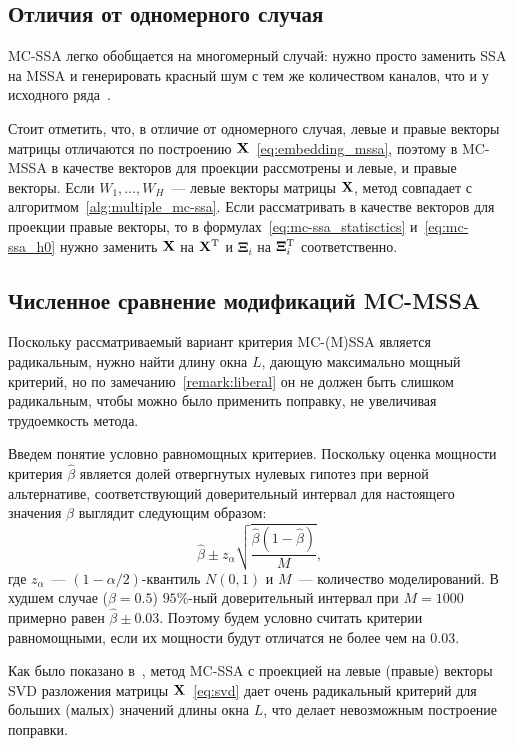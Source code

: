 \documentclass[specialist,
substylefile = spbu.rtx,
               subf,href,colorlinks=true,12pt]{disser}
\theoremstyle{definition}
\begin{document}
\subsection{Отличия от одномерного случая}
MC-SSA легко обобщается на многомерный случай: нужно просто заменить SSA на MSSA и генерировать красный шум с тем же количеством каналов, что и у исходного ряда~\cite{Groth2015}.

Стоит отметить, что, в отличие от одномерного случая, левые и правые векторы матрицы отличаются по построению $\mathbf{X}$~\eqref{eq:embedding_mssa}, поэтому в MC-MSSA в качестве векторов для проекции рассмотрены и левые, и правые векторы. Если $W_1,\ldots,W_H$~--- левые векторы матрицы $\mathbf{X}$, метод совпадает с алгоритмом~\ref{alg:multiple_mc-ssa}. Если рассматривать в качестве векторов для проекции правые векторы, то в формулах~\eqref{eq:mc-ssa_statisctics} и~\eqref{eq:mc-ssa_h0} нужно заменить $\mathbf{X}$ на $\mathbf{X}^{\mathrm{T}}$ и $\mathbf{\Xi}_i$ на $\mathbf{\Xi}_i^{\mathrm{T}}$ соответственно.

\subsection{Численное сравнение модификаций MC-MSSA}\label{sect:mc-mssa_numeric_comparison}
Поскольку рассматриваемый вариант критерия MC-(M)SSA является радикальным, нужно найти длину окна $L$, дающую максимально мощный критерий, но по замечанию~\ref{remark:liberal} он не должен быть слишком радикальным, чтобы можно было применить поправку, не увеличивая трудоемкость метода.

Введем понятие условно равномощных критериев. Поскольку оценка мощности критерия $\hat \beta$ является долей отвергнутых нулевых гипотез при верной альтернативе, соответствующий доверительный интервал для настоящего значения $\beta$ выглядит следующим образом:
\[
	\hat \beta \pm z_\alpha \sqrt{\frac{\hat \beta(1 - \hat \beta)}M},
\]
где $z_\alpha$~--- $(1-\alpha/2)$-квантиль $N(0, 1)$ и $M$~--- количество моделирований. В худшем случае ($\beta=0.5$) $95\%$-ный доверительный интервал при $M=1000$ примерно равен $\hat\beta \pm 0.03$. Поэтому будем условно считать критерии равномощными, если их мощности будут отличатся не более чем на $0.03$.

Как было показано в~\cite[Приложение  Б.2.4]{Larin2022}, метод MC-SSA с проекцией на левые (правые) векторы SVD разложения матрицы $\mathbf{X}$~\eqref{eq:svd} дает очень радикальный критерий для больших (малых) значений длины окна $L$, что делает невозможным построение поправки.
\end{document}
